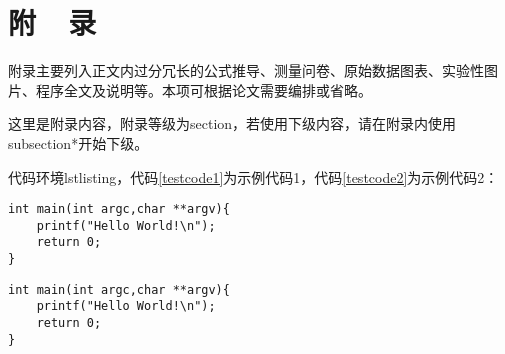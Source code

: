 \newpage
{}
{}
\section*{附~~录}
\vspace*{-2mm}
\setlength{\baselineskip}{25pt}
附录主要列入正文内过分冗长的公式推导、测量问卷、原始数据图表、实验性图片、程序全文及说明等。本项可根据论文需要编排或省略。

这里是附录内容，附录等级为section，若使用下级内容，请在附录内使用subsection*开始下级。

代码环境lstlisting，代码\ref{testcode1}为示例代码1，代码\ref{testcode2}为示例代码2：
\begin{lstlisting}[caption={代码示例1\label{testcode1}}]
int main(int argc,char **argv){
	printf("Hello World!\n");
	return 0;
}
\end{lstlisting}
\begin{lstlisting}[caption={代码示例2\label{testcode2}}]
int main(int argc,char **argv){
	printf("Hello World!\n");
	return 0;
}
\end{lstlisting}